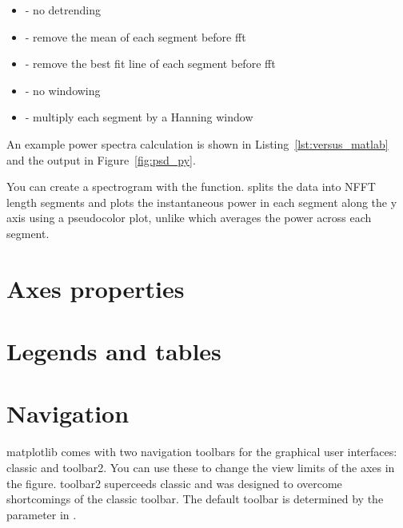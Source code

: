 \documentclass[twoside]{book}
\begin{document}
\begin{itemize}
\item {} - no detrending
\item {} - remove the mean of each segment before fft
\item {} - remove the best fit line of each segment
  before fft
\item {} - no windowing
\item {} - multiply each segment by a Hanning window

\end{itemize}

\noindent An example power spectra calculation is shown in
Listing~\ref{lst:versus_matlab} and the output in
Figure~\ref{fig:psd_py}.

You can create a spectrogram with the  function.
 splits the data into NFFT length segments and plots
the instantaneous power in each segment along the y axis using a
pseudocolor plot, unlike  which averages the power across
each segment.





\section{Axes properties}
\label{sec:axes_props}


\section{Legends and tables}
\label{sec:legends_and_tables}


\section{Navigation}
\label{sec:navigation}

matplotlib comes with two navigation toolbars for the graphical user
interfaces: classic and toolbar2.  You can use these to change the
view limits of the axes in the figure.  toolbar2 superceeds classic
and was designed to overcome shortcomings of the classic toolbar.  The
default toolbar is determined by the  parameter in
.
\end{document}
